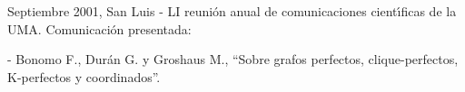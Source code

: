 \begin{compactitem}
\smallskip


\item Septiembre 2001, San Luis -  LI reuni\'on anual de
comunicaciones cient\'{\i}ficas de la UMA. Comunicaci\'on
presentada:
\begin{compactitem}
\item[-] Bonomo F., Dur\'an G. y Groshaus M., ``Sobre grafos
perfectos, clique-perfectos, K-perfectos y coordinados''.
\end{compactitem}

\end{compactitem}
